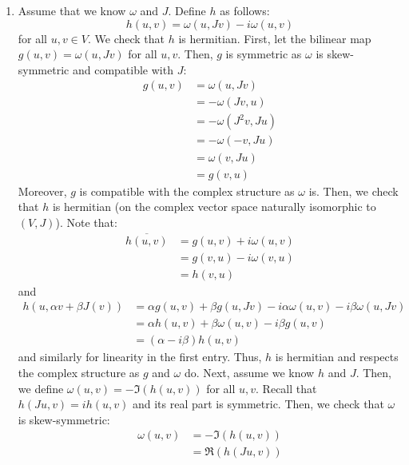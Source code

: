\documentclass[12pt]{article}
\begin{document}
\begin{solution}
    \bbni
    \begin{enumerate}
        \item Assume that we know $\omega$ and $J$. Define $h$ as follows: 
        \[ h(u, v) = \omega(u, Jv) -i\omega(u, v) \]
        for all $u, v \in V$. We check that $h$ is hermitian. First, let the bilinear map $g(u, v) = \omega(u, Jv)$ for all $u,v$. Then, $g$ is symmetric as $\omega$ is skew-symmetric and compatible with $J$: 
        \begin{align*}
            g(u, v) &= \omega(u, Jv) \\
            &= -\omega(Jv, u) \\
            &= -\omega(J^2 v, Ju) \\
            &= -\omega(-v, J u) \\
            &= \omega(v, Ju) \\
            &= g(v, u)
        \end{align*}
        Moreover, $g$ is compatible with the complex structure as $\omega$ is. 
        Then, we check that $h$ is hermitian (on the complex vector space naturally isomorphic to $(V, J)$). Note that:
        \begin{align*}
            \overline{h(u, v)} &= g(u, v) + i\omega(u, v) \\
            &= g(v,u) - i\omega(v, u) \\
            &= h(v, u)
        \end{align*}
        and 
        \begin{align*}
            h(u, \alpha v + \beta J(v)) &= \alpha g(u, v) + \beta g(u, Jv) - i\alpha\omega(u, v) -i\beta \omega(u, Jv) \\
            &= \alpha h(u, v) +\beta \omega(u, v) - i \beta g(u, v) \\
            &= (\alpha - i\beta)h(u, v)
        \end{align*}
        and similarly for linearity in the first entry. Thus, $h$ is hermitian and respects the complex structure as $g$ and $\omega$ do.
        \bbni
        Next, assume we know $h$ and $J$. Then, we define $\omega(u, v) = -\Im(h(u, v))$ for all $u, v$. Recall that $h(Ju, v) = ih(u,v)$ and its real part is symmetric. Then, we check that $\omega$ is skew-symmetric:
        \begin{align*}
            \omega(u, v) &= -\Im(h(u, v)) \\
            &= \Re(h(Ju, v)) \\

\end{align*}
\end{enumerate}
\end{solution}
\end{document}

